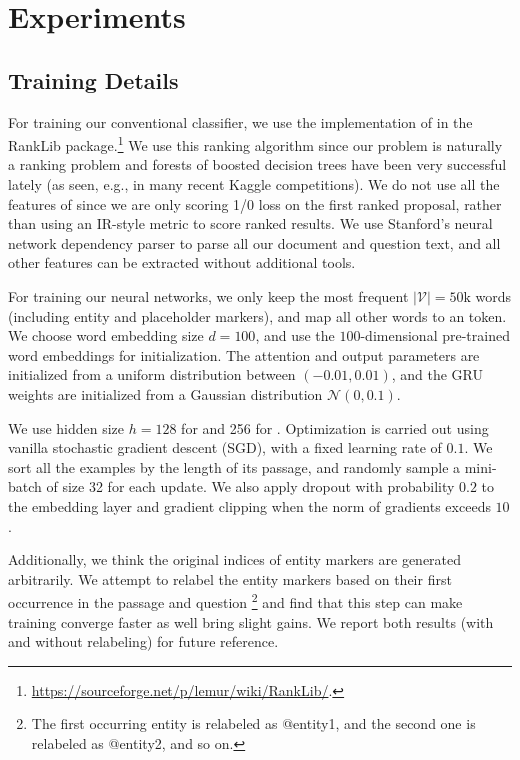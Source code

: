 

\section{Experiments}
\label{sec:experiments}
\subsection{Training Details}
For training our conventional classifier, we use the implementation of  \cite{wu2010adapting} in the RankLib package.\footnote{\url{https://sourceforge.net/p/lemur/wiki/RankLib/}.} We use this ranking algorithm since our problem is naturally a ranking problem and forests of boosted decision trees have been very successful lately (as seen, e.g., in many recent Kaggle competitions). We do not use all the features of  since we are only scoring 1/0 loss on the first ranked proposal, rather than using an IR-style metric to score ranked results. We use Stanford's neural network dependency parser \cite{chen2014fast} to parse all our document and question text, and all other features can be extracted without additional tools.

For training our neural networks, we only keep the most frequent $|\mathcal{V}| = 50\text{k}$ words (including entity and placeholder markers), and map all other words to an  token. We choose word embedding size $d = 100$, and use the $100$-dimensional pre-trained  word embeddings \cite{pennington2014glove} for initialization. The attention and output parameters are initialized from a uniform distribution between $(-0.01, 0.01)$, and the GRU weights are initialized from a Gaussian distribution $\mathcal{N}(0, 0.1)$.

We use hidden size $h = 128$ for  and 256 for . Optimization is carried out using vanilla stochastic gradient descent (SGD), with a fixed learning rate of $0.1$. We sort all the examples by the length of its passage, and randomly sample a mini-batch of size 32 for each update. We also apply dropout with probability $0.2$ to the embedding layer and gradient clipping when the norm of gradients exceeds $10$.

Additionally, we think the original indices of entity markers are generated arbitrarily. We attempt to relabel the entity markers based on their first occurrence in the passage and question \footnote{The first occurring entity is relabeled as @entity1, and the second one is relabeled as @entity2, and so on.} and find that this step can make training converge faster as well bring slight gains. We report both results (with and without relabeling) for future reference.

